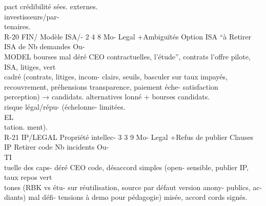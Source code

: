 \documentclass[12pt,landscape,a4paper]{article}
\begin{document}
pact crédibilité                                              sées.                              externes.\\
investisseurs/par-\\
tenaires.\\
R-20   FIN/      Modèle       ISA/- 2 4 8    Mo- Legal +Ambiguïtés        Option ISA “à Retirer ISA de Nb demandes Ou-\\
MODEL     bourses       mal           déré CEO   contractuelles, l’étude”, contrats l’offre     pilote, ISA,  litiges, vert\\
cadré (contrats,                       litiges,   incom- clairs,    seuils, basculer     sur taux impayés,\\
recouvrement,                          préhensions       transparence,      paiement éche- satisfaction\\
perception)     →                      candidats.        alternatives       lonné + bourses candidats.\\
risque légal/répu-                                      (échelonne-         limitées.\\
\vspace{0.5em}
\vspace{0.5em}
\vspace{0.5em}
\vspace{0.5em}
EL\\
tation.                                                  ment).\\
R-21   IP/LEGAL Propriété intellec- 3 3 9    Mo- Legal +Refus de publier Clauses          IP Retirer      code Nb incidents Ou-\\
\vspace{0.5em}
\vspace{0.5em}
\vspace{0.5em}
\vspace{0.5em}
TI\\
tuelle des caps-             déré CEO   code, désaccord simples       (open- sensible, publier IP, taux repos vert\\
tones (RBK vs étu-                      sur réutilisation, source par défaut version anony- publics,       ac-\\
diants) mal défi-                       tensions à demo pour pédagogie) misée,          accord cords signés.\\
\vspace{0.5em}
\vspace{0.5em}
\vspace{0.5em}
\vspace{0.5em}
\end{document}
